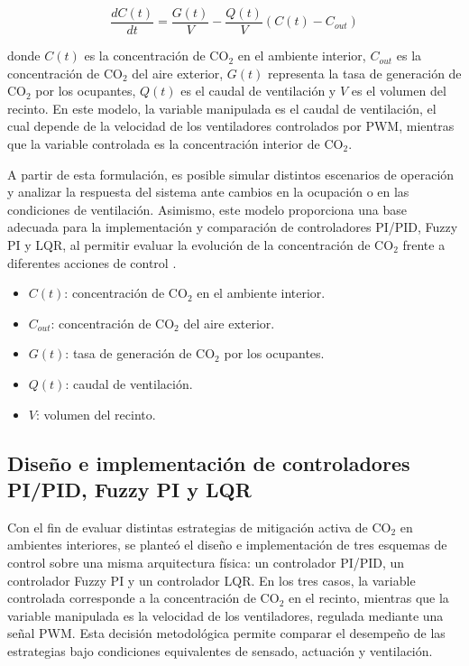 \begin{equation}
    \frac{dC(t)}{dt} = \frac{G(t)}{V} - \frac{Q(t)}{V}\left(C(t)-C_{out}\right)
\end{equation}

donde \(C(t)\) es la concentración de CO$_2$ en el ambiente interior, \(C_{out}\) es la concentración de CO$_2$ del aire exterior, \(G(t)\) representa la tasa de generación de CO$_2$ por los ocupantes, \(Q(t)\) es el caudal de ventilación y \(V\) es el volumen del recinto. En este modelo, la variable manipulada es el caudal de ventilación, el cual depende de la velocidad de los ventiladores controlados por PWM, mientras que la variable controlada es la concentración interior de CO$_2$.

A partir de esta formulación, es posible simular distintos escenarios de operación y analizar la respuesta del sistema ante cambios en la ocupación o en las condiciones de ventilación. Asimismo, este modelo proporciona una base adecuada para la implementación y comparación de controladores PI/PID, Fuzzy PI y LQR, al permitir evaluar la evolución de la concentración de CO$_2$ frente a diferentes acciones de control \cite{delwati_2018, bordin_2025}.


\begin{itemize}
    \item \(C(t)\): concentración de CO$_2$ en el ambiente interior.
    \item \(C_{out}\): concentración de CO$_2$ del aire exterior.
    \item \(G(t)\): tasa de generación de CO$_2$ por los ocupantes.
    \item \(Q(t)\): caudal de ventilación.
    \item \(V\): volumen del recinto.
\end{itemize}


\subsection{Diseño e implementación de controladores PI/PID, Fuzzy PI y LQR}

Con el fin de evaluar distintas estrategias de mitigación activa de CO$_2$ en ambientes interiores, se planteó el diseño e implementación de tres esquemas de control sobre una misma arquitectura física: un controlador PI/PID, un controlador Fuzzy PI y un controlador LQR. En los tres casos, la variable controlada corresponde a la concentración de CO$_2$ en el recinto, mientras que la variable manipulada es la velocidad de los ventiladores, regulada mediante una señal PWM. Esta decisión metodológica permite comparar el desempeño de las estrategias bajo condiciones equivalentes de sensado, actuación y ventilación.

